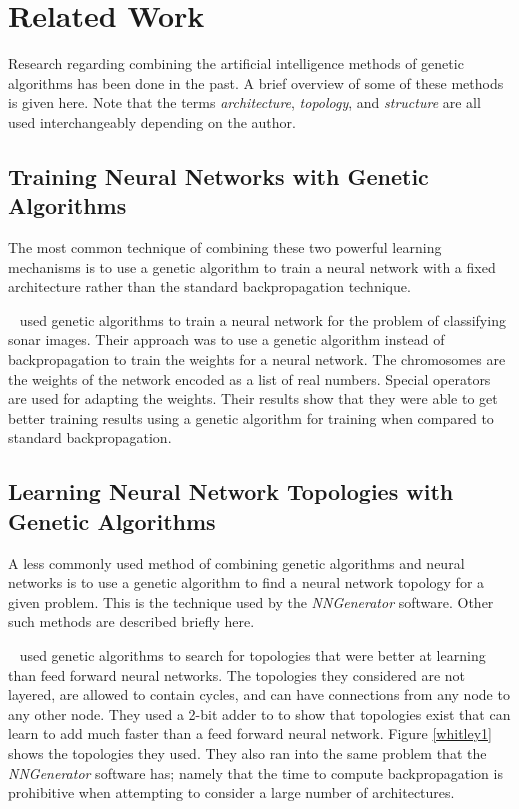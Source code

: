 \chapter[Related Work]{Related Work}
Research regarding combining the artificial intelligence methods of
genetic algorithms has been done in the past.
A brief overview of some of these methods is given here.
Note that the terms {\it architecture},  {\it topology}, and {\it
  structure} are all used interchangeably depending on the author.

\section{Training Neural Networks with Genetic Algorithms}

The most common technique of combining these two powerful learning
mechanisms is to use a genetic algorithm to train a neural network
with a fixed architecture rather than the standard backpropagation technique.

~\cite{montana} used genetic algorithms to train a neural network for
the problem of classifying sonar images.
Their approach was to use a genetic algorithm instead of
backpropagation to train the weights for a neural network.
The chromosomes are the weights of the network encoded as a list of
real numbers.
Special operators are used for adapting the weights.
Their results show that they were able to get better training results
using a genetic algorithm for training when compared to standard
backpropagation.


\section{Learning Neural Network Topologies with Genetic Algorithms}

A less commonly used method of combining genetic algorithms and neural
networks is to use a genetic algorithm to find a neural network
topology for a given problem.
This is the technique used by the {\it NNGenerator} software.
Other such methods are described briefly here.

~\cite{whitley} used genetic algorithms to search for topologies that
were better at learning than feed forward neural networks.
The topologies they considered are not layered, are allowed to contain cycles, and can
have connections from any node to any other node.
They used a 2-bit adder to to show that topologies exist that can
learn to add much faster than a feed forward neural network.
Figure \ref{whitley1} shows the topologies they used.
They also ran into the same problem that the {\it NNGenerator}
software has; namely that the time to compute backpropagation is
prohibitive when attempting to consider a large number of
architectures.

